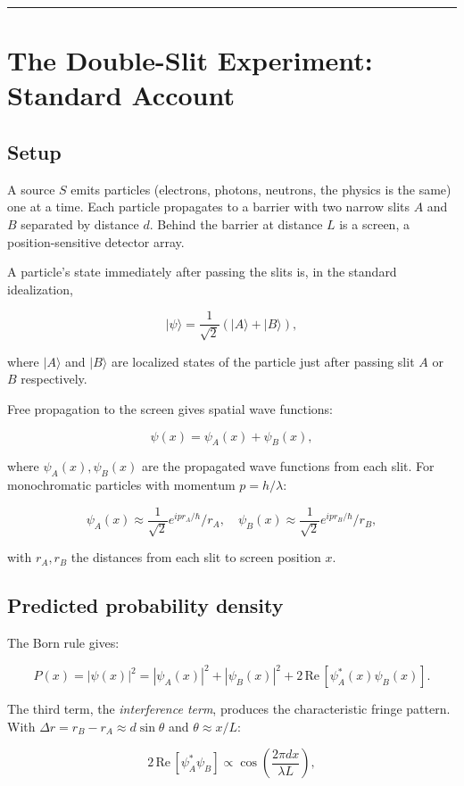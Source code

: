 \documentclass[11pt,a4paper]{article}
\begin{document}
\medskip\hrule\medskip

\section{The Double-Slit Experiment: Standard Account}

\subsection{Setup}

A source $S$ emits particles (electrons, photons, neutrons, the physics is the same) one at a time. Each particle propagates to a barrier with two narrow slits $A$ and $B$ separated by distance $d$. Behind the barrier at distance $L$ is a screen, a position-sensitive detector array.

A particle's state immediately after passing the slits is, in the standard idealization,

\[
|\psi\rangle = \frac{1}{\sqrt{2}}\left(|A\rangle + |B\rangle\right),
\]

where $|A\rangle$ and $|B\rangle$ are localized states of the particle just after passing slit $A$ or $B$ respectively.

Free propagation to the screen gives spatial wave functions:

\[
\psi(x) = \psi_A(x) + \psi_B(x),
\]

where $\psi_A(x), \psi_B(x)$ are the propagated wave functions from each slit. For monochromatic particles with momentum $p = h/\lambda$:

\[
\psi_A(x) \approx \frac{1}{\sqrt{2}} e^{ipr_A/\hbar}/r_A, \quad \psi_B(x) \approx \frac{1}{\sqrt{2}} e^{ipr_B/\hbar}/r_B,
\]

with $r_A, r_B$ the distances from each slit to screen position $x$.

\subsection{Predicted probability density}

The Born rule gives:

\[
P(x) = |\psi(x)|^2 = |\psi_A(x)|^2 + |\psi_B(x)|^2 + 2\,\mathrm{Re}\,[\psi_A^*(x)\psi_B(x)].
\]

The third term, the \emph{interference term}, produces the characteristic fringe pattern. With $\Delta r = r_B - r_A \approx d \sin\theta$ and $\theta \approx x/L$:

\[
2\,\mathrm{Re}\,[\psi_A^*\psi_B] \propto \cos\left(\frac{2\pi d x}{\lambda L}\right),
\]
\end{document}
